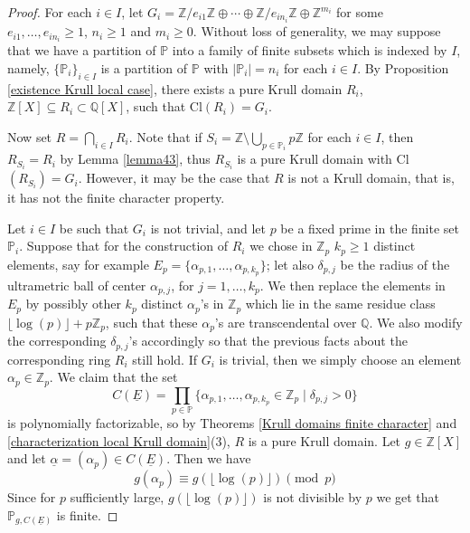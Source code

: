 \documentclass[10pt]{article}
\numberwithin{equation}{section}
\theoremstyle{definition}
\theoremstyle{definition}
\newcommand{\Q}{\mathbb{Q}}
\newcommand{\Z}{\mathbb{Z}}
\newcommand{\PP}{\mathbb{P}}
\newcommand{\Int}{\textnormal{Int}}
\newcommand{\IntQ}{\Int_{\Q}}
\newcommand\rc { \color{red}}
\begin{document}
\begin{proof}
For each $i\in I$, let $G_i=\Z/e_{i1}\Z \oplus \cdots \oplus \Z/e_{in_i}\Z \oplus \Z^{m_i}$ for some $e_{i1}, \dots, e_{in_i} \geq 1$, $n_i \geq 1$ and $m_i\geq 0$. Without loss of generality, we may suppose that we have a partition of $\PP$ into a family of finite subsets which is indexed by $I$, namely,  $\{\PP_i\}_{i \in I}$ is a partition of $\PP$ with $|\PP_i| = n_i$ for each $i\in I$. By Proposition \ref{existence Krull local case}, there exists a pure Krull domain $R_i$, $\Z[X]\subseteq R_i\subset \Q[X]$, such that Cl$(R_i)=G_i$. 

Now set $R=\bigcap\limits_{i\in I}R_i$. Note that if $S_i = \Z \setminus \bigcup\limits_{p \in \PP_i}p\Z$ for each $i \in I$, then $R_{S_i} = R_i$ by Lemma \ref{lemma43}, thus
$R_{S_i}$ is a pure Krull domain with Cl$(R_{S_i}) = G_i$.
However, it may be the case that $R$ is not a Krull domain, that is, it has not the finite character property.

Let $i\in I$ be such that $G_i$ is not trivial, and let $p$ be a fixed prime in the finite set $\PP_i$. Suppose that for the construction of $R_i$ we chose in $\Z_p$ $k_p\geq 1$ distinct elements, say for example $E_p=\{\alpha_{p,1},\ldots,\alpha_{p,k_p}\}$; let also $\delta_{p,j}$ be the radius of the ultrametric ball of center $\alpha_{p,j}$, for $j=1,\ldots,k_p$. We then   replace the elements in $E_p$ by possibly other  $k_p$ distinct $\alpha_p$'s in $\Z_p$ which lie in the same residue class $\lfloor\log(p)\rfloor+p\Z_{p}$, such that these $\alpha_p$'s are transcendental over $\Q$. We also modify the corresponding $\delta_{p,j}$'s accordingly so that the previous facts about the corresponding ring $R_i$ still hold. If $G_i$ is trivial, then we simply choose an element $\alpha_p\in\Z_{p}$. We claim that the set 
$$C(\underline E)=\prod_{p\in \PP}\{\alpha_{p,1},\ldots,\alpha_{p,k_p}\in \Z_p\mid \delta_{p,j}>0\}$$
is polynomially factorizable, so by Theorems \ref{Krull domains finite character} and \ref{characterization local Krull domain}(3), $R$ is a pure Krull domain. Let $g\in\Z[X]$ and let $\underline{\alpha}=(\alpha_p)\in C(\underline E)$. Then we have
$$g(\alpha_p)\equiv g(\lfloor\log(p)\rfloor)\pmod{p}$$
Since for $p$ sufficiently large, $g(\lfloor\log(p)\rfloor)$ is not divisible by $p$ we get that $\PP_{g,C(\underline{E})}$ is finite.
\end{proof}
\end{document}
